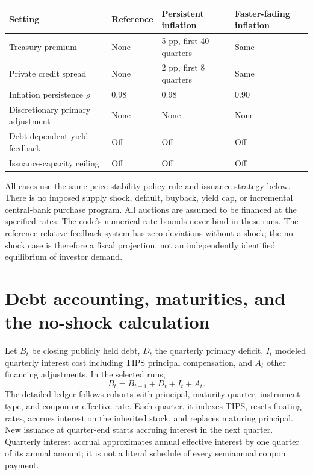 \documentclass[11pt,letterpaper]{article}
\begin{document}
\begin{center}
\small
\begin{tabularx}{\linewidth}{@{}lXXX@{}}
\toprule
Setting & Reference & Persistent inflation & Faster-fading inflation\\
\midrule
Treasury premium & None & 5 pp, first 40 quarters & Same\\
Private credit spread & None & 2 pp, first 8 quarters & Same\\
Inflation persistence \(\rho\) & 0.98 & 0.98 & 0.90\\
Discretionary primary adjustment & None & None & None\\
Debt-dependent yield feedback & Off & Off & Off\\
Issuance-capacity ceiling & Off & Off & Off\\
\bottomrule
\end{tabularx}
\end{center}

All cases use the same price-stability policy rule and issuance strategy below.
There is no imposed supply shock, default, buyback, yield cap, or incremental
central-bank purchase program. All auctions are assumed to be financed at the
specified rates. The code's numerical rate bounds never bind in these runs.
The reference-relative feedback system has zero deviations without a shock;
the no-shock case is therefore a fiscal projection, not an independently
identified equilibrium of investor demand.

\section{Debt accounting, maturities, and the no-shock calculation}

Let \(B_t\) be closing publicly held debt, \(D_t\) the quarterly primary deficit,
\(I_t\) modeled quarterly interest cost including TIPS principal compensation,
and \(A_t\) other financing adjustments. In the selected runs,
\begin{equation}
 B_t=B_{t-1}+D_t+I_t+A_t.
 \label{eq:ledger}
\end{equation}
The detailed ledger follows cohorts with principal, maturity quarter,
instrument type, and coupon or effective rate. Each quarter, it indexes TIPS,
resets floating rates, accrues interest on the inherited stock, and replaces
maturing principal. New issuance at quarter-end starts accruing interest in
the next quarter. Quarterly interest accrual approximates annual effective
interest by one quarter of its annual amount; it is not a literal schedule of
every semiannual coupon payment.
\end{document}
